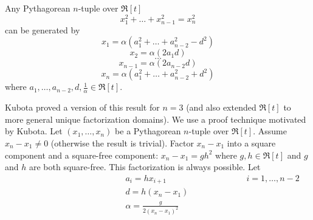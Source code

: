 
\begin{theorem}
\label{thm:complete}
Any Pythagorean $n$-tuple over $\Re[t]$
\[
	x_1^2 + \ldots + x_{n-1}^2 = x_n^2
\]
can be generated by 
\begin{equation}
\label{eq:pythn2}
	x_1 = \alpha (a_1^2+\ldots+a_{n-2}^2-d^2)
\end{equation}
\[
	x_2 = \alpha (2a_1d)
\]
\[
	\ldots
\]
\[
	x_{n-1} = \alpha (2a_{n-2}d)
\]
\[
	x_n = \alpha (a_1^2+\ldots+a_{n-2}^2+d^2)
\]
where $a_1,\ldots,a_{n-2},d,\frac{1}{\alpha} \in \Re[t]$.
\end{theorem}
\prf
Kubota \cite{kubota72} proved a version of this result for $n=3$ 
(and also extended $\Re[t]$ to more general unique factorization domains).
We use a proof technique motivated by Kubota.
Let $(x_1,\ldots,x_n)$ be a Pythagorean $n$-tuple over $\Re[t]$.
Assume $x_n - x_1 \neq 0$ (otherwise the result is trivial).
Factor $x_n - x_1$ into a square component and a square-free component:
$x_n - x_1 = gh^2$ where $g,h \in \Re[t]$ and $g$ and $h$ are both square-free.
This factorization is always possible.
Let 
\[
\begin{array}{lll}
\hspace{2in} & a_i = hx_{i+1} & \hspace{1in} i=1,\ldots,n-2 \\
& d = h(x_n - x_1) \\
& \alpha = \frac{g}{2(x_n - x_1)^2}
\end{array}
\]
